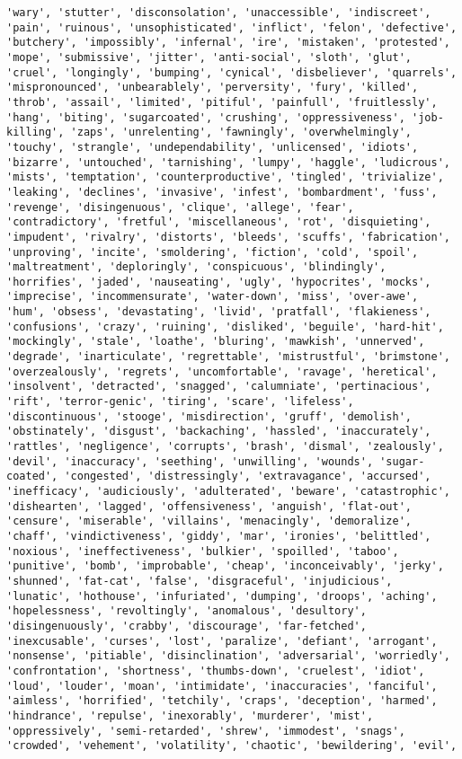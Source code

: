 \documentclass[11pt]{article}
\begin{document}
\begin{Verbatim}[commandchars=\\\{\}]
'wary', 'stutter', 'disconsolation', 'unaccessible', 'indiscreet', 'pain', 'ruinous', 'unsophisticated', 'inflict', 'felon', 'defective', 'butchery', 'impossibly', 'infernal', 'ire', 'mistaken', 'protested', 'mope', 'submissive', 'jitter', 'anti-social', 'sloth', 'glut', 'cruel', 'longingly', 'bumping', 'cynical', 'disbeliever', 'quarrels', 'mispronounced', 'unbearablely', 'perversity', 'fury', 'killed', 'throb', 'assail', 'limited', 'pitiful', 'painfull', 'fruitlessly', 'hang', 'biting', 'sugarcoated', 'crushing', 'oppressiveness', 'job-killing', 'zaps', 'unrelenting', 'fawningly', 'overwhelmingly', 'touchy', 'strangle', 'undependability', 'unlicensed', 'idiots', 'bizarre', 'untouched', 'tarnishing', 'lumpy', 'haggle', 'ludicrous', 'mists', 'temptation', 'counterproductive', 'tingled', 'trivialize', 'leaking', 'declines', 'invasive', 'infest', 'bombardment', 'fuss', 'revenge', 'disingenuous', 'clique', 'allege', 'fear', 'contradictory', 'fretful', 'miscellaneous', 'rot', 'disquieting', 'impudent', 'rivalry', 'distorts', 'bleeds', 'scuffs', 'fabrication', 'unproving', 'incite', 'smoldering', 'fiction', 'cold', 'spoil', 'maltreatment', 'deploringly', 'conspicuous', 'blindingly', 'horrifies', 'jaded', 'nauseating', 'ugly', 'hypocrites', 'mocks', 'imprecise', 'incommensurate', 'water-down', 'miss', 'over-awe', 'hum', 'obsess', 'devastating', 'livid', 'pratfall', 'flakieness', 'confusions', 'crazy', 'ruining', 'disliked', 'beguile', 'hard-hit', 'mockingly', 'stale', 'loathe', 'bluring', 'mawkish', 'unnerved', 'degrade', 'inarticulate', 'regrettable', 'mistrustful', 'brimstone', 'overzealously', 'regrets', 'uncomfortable', 'ravage', 'heretical', 'insolvent', 'detracted', 'snagged', 'calumniate', 'pertinacious', 'rift', 'terror-genic', 'tiring', 'scare', 'lifeless', 'discontinuous', 'stooge', 'misdirection', 'gruff', 'demolish', 'obstinately', 'disgust', 'backaching', 'hassled', 'inaccurately', 'rattles', 'negligence', 'corrupts', 'brash', 'dismal', 'zealously', 'devil', 'inaccuracy', 'seething', 'unwilling', 'wounds', 'sugar-coated', 'congested', 'distressingly', 'extravagance', 'accursed', 'inefficacy', 'audiciously', 'adulterated', 'beware', 'catastrophic', 'dishearten', 'lagged', 'offensiveness', 'anguish', 'flat-out', 'censure', 'miserable', 'villains', 'menacingly', 'demoralize', 'chaff', 'vindictiveness', 'giddy', 'mar', 'ironies', 'belittled', 'noxious', 'ineffectiveness', 'bulkier', 'spoilled', 'taboo', 'punitive', 'bomb', 'improbable', 'cheap', 'inconceivably', 'jerky', 'shunned', 'fat-cat', 'false', 'disgraceful', 'injudicious', 'lunatic', 'hothouse', 'infuriated', 'dumping', 'droops', 'aching', 'hopelessness', 'revoltingly', 'anomalous', 'desultory', 'disingenuously', 'crabby', 'discourage', 'far-fetched', 'inexcusable', 'curses', 'lost', 'paralize', 'defiant', 'arrogant', 'nonsense', 'pitiable', 'disinclination', 'adversarial', 'worriedly', 'confrontation', 'shortness', 'thumbs-down', 'cruelest', 'idiot', 'loud', 'louder', 'moan', 'intimidate', 'inaccuracies', 'fanciful', 'aimless', 'horrified', 'tetchily', 'craps', 'deception', 'harmed', 'hindrance', 'repulse', 'inexorably', 'murderer', 'mist', 'oppressively', 'semi-retarded', 'shrew', 'immodest', 'snags', 'crowded', 'vehement', 'volatility', 'chaotic', 'bewildering', 'evil', 
\end{Verbatim}
\end{document}
